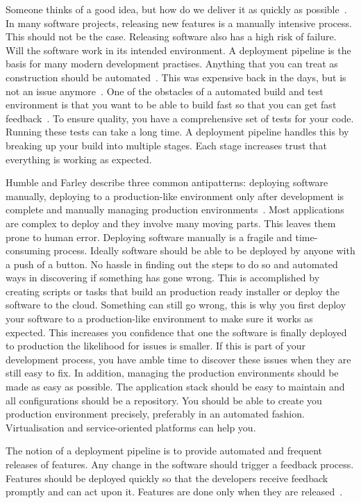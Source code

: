 \documentclass[english]{tktltiki2}
\begin{document}
Someone thinks of a good idea, but how do we deliver it as quickly as possible~\cite{HF11}. In many software projects, releasing new features is a manually intensive process. This should not be the case. Releasing software also has a high risk of failure. Will the software work in its intended environment. A deployment pipeline is the basis for many modern development practises. Anything that you can treat as construction should be automated~\cite{Fow05}. This was expensive back in the days, but is not an issue anymore~\cite{Roy70}. One of the obstacles of a automated build and test environment is that you want to be able to build fast so that you can get fast feedback~\cite{Fow13b}. To ensure quality, you have a comprehensive set of tests for your code. Running these tests can take a long time. A deployment pipeline handles this by breaking up your build into multiple stages. Each stage increases trust that everything is working as expected.

Humble and Farley describe three common antipatterns: deploying software manually, deploying to a production-like environment only after development is complete and manually managing production environments~\cite{HF11}. Most applications are complex to deploy and they involve many moving parts. This leaves them prone to human error. Deploying software manually is a fragile and time-consuming process. Ideally software should be able to be deployed by anyone with a push of a button. No hassle in finding out the steps to do so and automated ways in discovering if something has gone wrong. This is accomplished by creating scripts or tasks that build an production ready installer or deploy the software to the cloud. Something can still go wrong, this is why you first deploy your software to a production-like environment to make sure it works as expected. This increases you confidence that one the software is finally deployed to production the likelihood for issues is smaller. If this is part of your development process, you have amble time to discover these issues when they are still easy to fix. In addition, managing the production environments should be made as easy as possible. The application stack should be easy to maintain and all configurations should be a repository. You should be able to create you production environment precisely, preferably in an automated fashion. Virtualisation and service-oriented platforms can help you.

The notion of a deployment pipeline is to provide automated and frequent releases of features. Any change in the software should trigger a feedback process. Features should be deployed quickly so that the developers receive feedback promptly and can act upon it. Features are done only when they are released~\cite{HF11}.
\end{document}
